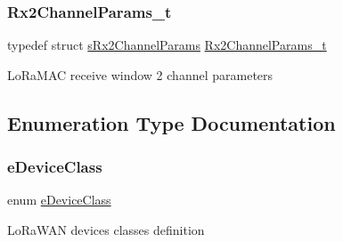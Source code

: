 \subsubsection{\texorpdfstring{Rx2\+Channel\+Params\+\_\+t}{Rx2ChannelParams\_t}}
{\footnotesize\ttfamily typedef struct \hyperlink{structsRx2ChannelParams}{s\+Rx2\+Channel\+Params} \hyperlink{group__LORAMAC_ga8f57f29481ea92c24f6af04b96a95e0f}{Rx2\+Channel\+Params\+\_\+t}}

Lo\+Ra\+M\+AC receive window 2 channel parameters 

\subsection{Enumeration Type Documentation}
\mbox{\label{group__LORAMAC_ga133e92597739340bac439d1b0916dcb6}} 
\subsubsection{\texorpdfstring{e\+Device\+Class}{eDeviceClass}}
{\footnotesize\ttfamily enum \hyperlink{group__LORAMAC_ga133e92597739340bac439d1b0916dcb6}{e\+Device\+Class}}

Lo\+Ra\+W\+AN devices classes definition

